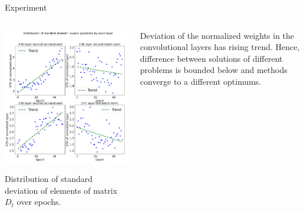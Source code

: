 \documentclass[aspectratio=169, 12pt]{beamer}
\begin{document}
\begin{frame}[shrink]{Experiment}
\begin{columns}[T]

\begin{center}
\includegraphics[scale=0.18]{new_layers.png}
    
    Distribution of standard deviation of elements of matrix $D_t$ over epochs. 
\end{center}
\begin{center}
  Deviation of the normalized weights in the convolutional layers has rising trend. Hence, difference
between solutions of different problems is bounded below and methods converge to a different optimums.
\end{center}
\end{columns}
\end{frame}
\end{document}
